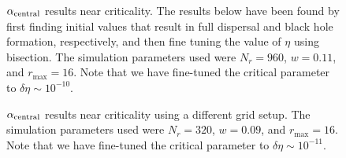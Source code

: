 \documentclass[a4paper,11pt]{article}
\renewcommand{\d}{\delta}
\begin{document}
\begin{figure}[H]
  \centering
  
  \caption[$\alpha_{\rm central}$ results near criticality.]{$\alpha_{\rm central}$ results near criticality. The results below have been found by first finding initial values that result in full dispersal and black hole formation, respectively, and then fine tuning the value of $\eta$ using bisection. The simulation parameters used were $N_{r}=960$, $w=0.11$, and $r_{\max}=16$. Note that we have fine-tuned the critical parameter to $\d\eta\sim10^{-10}$.}
  \label{fig:critical_alpha}
\end{figure}

\begin{figure}[H]
  \centering
  
  \caption[$\alpha_{\rm central}$ results near criticality using a different grid setup.]{$\alpha_{\rm central}$ results near criticality using a different grid setup. The simulation parameters used were $N_{r}=320$, $w=0.09$, and $r_{\max}=16$. Note that we have fine-tuned the critical parameter to $\d\eta\sim10^{-11}$.}
  \label{fig:critical_alpha_new}
\end{figure}

\clearpage
{}
\printbibliography
\end{document}
